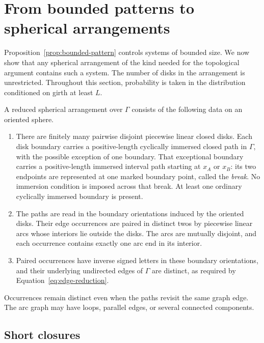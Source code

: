 \section{From bounded patterns to spherical arrangements}
\label{sec:planar}

Proposition~\ref{prop:bounded-pattern} controls systems of bounded size.
We now show that any spherical arrangement of the kind needed for the
topological argument contains such a system.  The number of disks in the
arrangement is unrestricted.  Throughout this section, probability is
taken in the distribution conditioned on girth at least $L$.

\begin{definition}
\label{def:arrangement}
A reduced spherical arrangement over $\Gamma$ consists of the following
data on an oriented sphere.
\begin{enumerate}
\item There are finitely many pairwise disjoint piecewise linear closed
disks.  Each disk boundary carries a positive-length cyclically immersed
closed path in $\Gamma$, with the possible exception of one boundary.
That exceptional boundary carries a positive-length immersed interval
path starting at $x_A$ or $x_B$: its two endpoints are represented at one
marked boundary point, called the \emph{break}.  No immersion condition
is imposed across that break.  At least one ordinary cyclically immersed
boundary is present.
\item The paths are read in the boundary orientations induced by the
oriented disks.  Their edge occurrences are paired in distinct twos by
piecewise linear arcs whose interiors lie outside the disks.  The arcs
are mutually disjoint, and each occurrence contains exactly one arc end
in its interior.
\item Paired occurrences have inverse signed letters in these boundary
orientations, and their underlying undirected edges of $\Gamma$ are
distinct, as required by Equation~\ref{eq:edge-reduction}.
\end{enumerate}
Occurrences remain distinct even when the paths revisit the same graph
edge.  The arc graph may have loops, parallel edges, or several connected
components.
\end{definition}

\subsection{Short closures}

